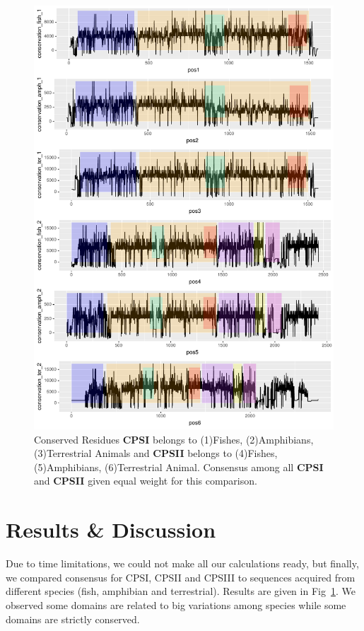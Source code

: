 \documentclass[a4paper]{article}
\begin{document}
\newpage
\begin{figure}[H]
\begin{center}
\includegraphics[width=\textwidth]{vsconsensus.pdf}
\end{center}
\caption{Conserved Residues \textbf{CPSI} belongs to (1)Fishes, (2)Amphibians, (3)Terrestrial Animals and \textbf{CPSII} belongs to (4)Fishes, (5)Amphibians, (6)Terrestrial Animal. Consensus among all \textbf{CPSI} and \textbf{CPSII} given equal weight for this comparison.}
\label{fig:biggraph2}
\end{figure}

\section{Results & Discussion}
Due to time limitations, we could not make all our calculations ready, but finally, we compared consensus for CPSI, CPSII and CPSIII to sequences acquired from different species (fish, amphibian and terrestrial). Results are given in Fig~\ref{fig:biggraph2}. We observed some domains are related to big variations among species while some domains are strictly conserved.

\end{document}
